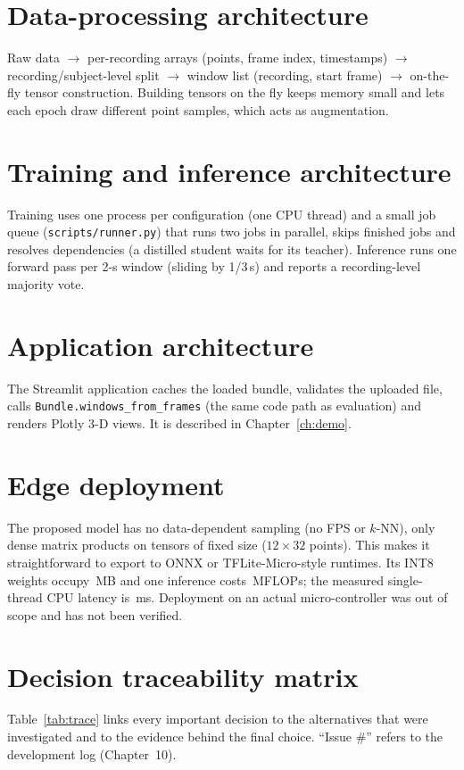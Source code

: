 \section{Data-processing architecture}
Raw data $\rightarrow$ per-recording arrays (points, frame index, timestamps)
$\rightarrow$ recording/subject-level split $\rightarrow$ window list (recording, start
frame) $\rightarrow$ on-the-fly tensor construction. Building tensors on the fly
keeps memory small and lets each epoch draw different point samples, which acts as
augmentation.

\section{Training and inference architecture}
Training uses one process per configuration (one CPU thread) and a small job queue
(\texttt{scripts/runner.py}) that runs two jobs in parallel, skips finished jobs and
resolves dependencies (a distilled student waits for its teacher). Inference
runs one forward pass per 2-s window (sliding by 1/3\,s) and reports a
recording-level majority vote.

\section{Application architecture}
The Streamlit application caches the loaded bundle, validates the uploaded file,
calls \texttt{Bundle.windows\_from\_frames} (the same code path as evaluation) and
renders Plotly 3-D views. It is described in Chapter~\ref{ch:demo}.

\section{Edge deployment}
The proposed model has no data-dependent sampling (no FPS or $k$-NN), only dense
matrix products on tensors of fixed size ($12\times32$ points). This makes it
straightforward to export to ONNX or TFLite-Micro-style runtimes. Its INT8 weights
occupy \oursIntMB\,MB and one inference costs \oursMflops\,MFLOPs; the measured
single-thread CPU latency is \oursLat\,ms. Deployment on an actual micro-controller
was out of scope and has not been verified.

\section{Decision traceability matrix}
Table~\ref{tab:trace} links every important decision to the alternatives that
were investigated and to the evidence behind the final choice. ``Issue \#'' refers
to the development log (Chapter~10).

